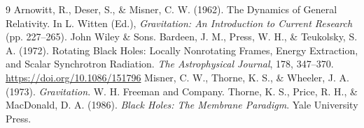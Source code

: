 \documentclass[11pt,a4paper]{article}
\begin{document}
\begin{thebibliography}{9}
 Arnowitt, R., Deser, S., \& Misner, C. W. (1962). The Dynamics of General Relativity. In L. Witten (Ed.), \textit{Gravitation: An Introduction to Current Research} (pp. 227--265). John Wiley \& Sons.
 Bardeen, J. M., Press, W. H., \& Teukolsky, S. A. (1972). Rotating Black Holes: Locally Nonrotating Frames, Energy Extraction, and Scalar Synchrotron Radiation. \textit{The Astrophysical Journal}, 178, 347--370. \url{https://doi.org/10.1086/151796}
 Misner, C. W., Thorne, K. S., \& Wheeler, J. A. (1973). \textit{Gravitation}. W. H. Freeman and Company.
 Thorne, K. S., Price, R. H., \& MacDonald, D. A. (1986). \textit{Black Holes: The Membrane Paradigm}. Yale University Press.
\end{thebibliography}
\end{document}
